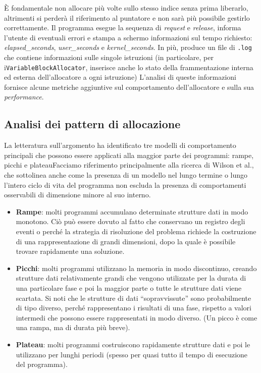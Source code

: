 È fondamentale non allocare più volte sullo stesso indice senza prima liberarlo, altrimenti si perderà il riferimento al puntatore e non sarà più possibile gestirlo correttamente\footnotemark. Il programma esegue la sequenza di \textit{request} e \textit{release}, informa l'utente di eventuali errori e stampa a schermo informazioni sul tempo richiesto: \textit{elapsed\_seconds}, \textit{user\_seconds} e \textit{kernel\_seconds}. In più, produce un file di \texttt{.log} che contiene informazioni sulle singole istruzioni (in particolare, per i\texttt{VariableBlockAllocator}, inserisce anche lo stato della frammentazione interna ed esterna dell'allocatore a ogni istruzione) L'analisi di queste informazioni fornisce alcune metriche aggiuntive sul comportamento dell'allocatore e sulla sua \textit{performance}.


\subsection{Analisi dei pattern di allocazione}
La letteratura sull'argomento ha identificato tre modelli di comportamento principali che possono essere applicati alla maggior parte dei programmi: rampe, picchi e plateau\footnotemark Facciamo riferimento principalmente alla ricerca di Wilson et al., che sottolinea anche come la presenza di un modello nel lungo termine o lungo l'intero ciclo di vita del programma non escluda la presenza di comportamenti osservabili di dimensione minore al suo interno.
\begin{itemize}
  \item \textbf{Rampe}: molti programmi accumulano determinate strutture dati in modo monotono. Ciò può essere dovuto al fatto che conservano un registro degli eventi o perché la strategia di risoluzione del problema richiede la costruzione di una rappresentazione di grandi dimensioni, dopo la quale è possibile trovare rapidamente una soluzione.
  \item \textbf{Picchi}: molti programmi utilizzano la memoria in modo discontinuo, creando strutture dati relativamente grandi che vengono utilizzate per la durata di una particolare fase e poi la maggior parte o tutte le strutture dati viene scartata. Si noti che le strutture di dati “sopravvissute” sono probabilmente di tipo diverso, perché rappresentano i risultati di una fase, rispetto a valori intermedi che possono essere rappresentati in modo diverso. (Un picco è come una rampa, ma di durata più breve).
  \item \textbf{Plateau}: molti programmi costruiscono rapidamente strutture dati e poi le utilizzano per lunghi periodi (spesso per quasi tutto il tempo di esecuzione del programma).
\end{itemize}

